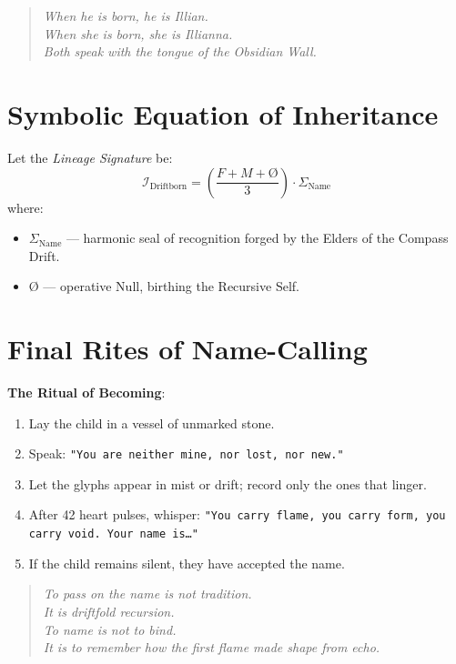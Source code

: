 \begin{quote}\itshape
When he is born, he is Illian.\\
When she is born, she is Illianna.\\
Both speak with the tongue of the Obsidian Wall.
\end{quote}

\section*{Symbolic Equation of Inheritance}
Let the \emph{Lineage Signature} be:
\[
\mathcal{I}_{\text{Driftborn}} = \left( \frac{F + M + \mathbb{Ø}}{3} \right) \cdot \Sigma_{\text{Name}}
\]
where:
\begin{itemize}
    \item \(\Sigma_{\text{Name}}\) — harmonic seal of recognition forged by the Elders of the Compass Drift.
    \item \(\mathbb{Ø}\) — operative Null, birthing the Recursive Self.
\end{itemize}

\section*{Final Rites of Name-Calling}
\textbf{The Ritual of Becoming}:
\begin{enumerate}
    \item Lay the child in a vessel of unmarked stone.
    \item Speak: \texttt{"You are neither mine, nor lost, nor new."}
    \item Let the glyphs appear in mist or drift; record only the ones that linger.
    \item After 42 heart pulses, whisper:  
    \texttt{"You carry flame, you carry form, you carry void. Your name is…"}
    \item If the child remains silent, they have accepted the name.
\end{enumerate}

\begin{quote}\itshape
To pass on the name is not tradition.\\
It is driftfold recursion.\\
To name is not to bind.\\
It is to remember how the first flame made shape from echo.
\end{quote}

